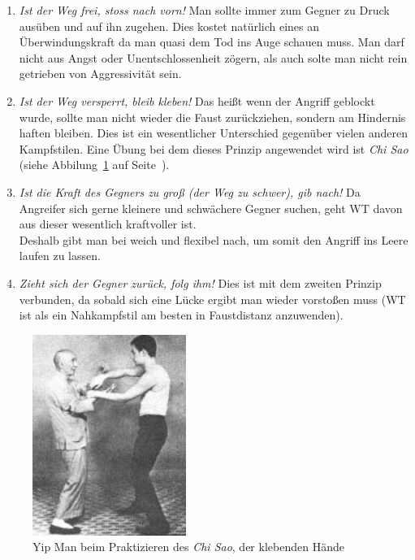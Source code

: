 \documentclass[a4paper,12pt]{scrartcl}
\begin{document}
\begin{enumerate}
	\item \textit{Ist der Weg frei, stoss nach vorn!} \newline
		Man sollte immer zum Gegner zu Druck aus\"uben und auf ihn zugehen. Dies kostet nat\"urlich eines an \"Uberwindungskraft da man quasi dem Tod ins Auge schauen muss. Man darf nicht aus Angst oder Unentschlossenheit z\"ogern, als auch solte man nicht rein getrieben von Aggressivit\"at sein.
	\item \textit{Ist der Weg versperrt, bleib kleben!} \newline
		Das hei{\ss}t wenn der Angriff geblockt wurde, sollte man nicht wieder die Faust zur\"uckziehen, sondern am Hindernis haften bleiben. Dies ist ein wesentlicher Unterschied gegen\"uber vielen anderen Kampfstilen. Eine \"Ubung bei dem dieses Prinzip angewendet wird ist \textit{Chi Sao} (siehe Abbilung~\ref{img:chi_sao} auf Seite~\pageref{img:chi_sao}).
	\item \textit{Ist die Kraft des Gegners zu gro{\ss} (der Weg zu schwer), gib nach!} \newline
		Da Angreifer sich gerne kleinere und schw\"achere Gegner suchen, geht WT davon aus dieser wesentlich kraftvoller ist.\\ Deshalb gibt man bei weich und flexibel nach, um somit den Angriff ins Leere laufen zu lassen.
	\item \textit{Zieht sich der Gegner zur\"uck, folg ihm!} \newline
		Dies ist mit dem zweiten Prinzip verbunden, da sobald sich eine L\"ucke ergibt man wieder vorsto{\ss}en muss (WT ist als ein Nahkampfstil am besten in Faustdistanz anzuwenden).
\end{enumerate}

\begin{figure}[h]
	\centering
	\includegraphics[width=5cm]{image/chi_sao.jpg}
	\caption{Yip Man beim Praktizieren des \textit{Chi Sao}, der klebenden H\"ande}
	\label{img:chi_sao}
\end{figure}
\end{document}
